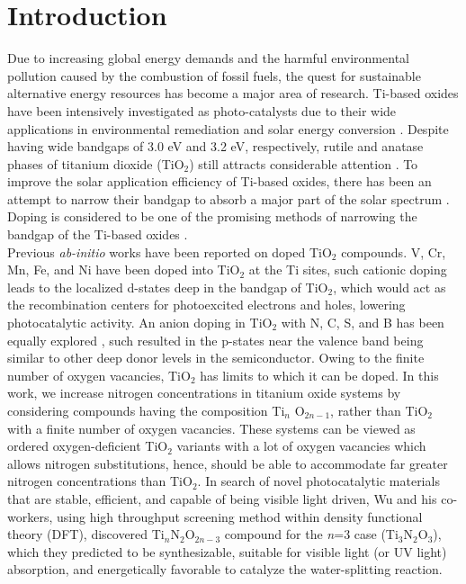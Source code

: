 \documentclass[aps,prb,superscriptaddress,twocolumn,floatfix,showpacs,amsmath]{revtex4-1}
\begin{document}
\section{Introduction}
Due to increasing global energy demands and the harmful environmental pollution caused by the combustion of fossil fuels, the quest for sustainable alternative energy resources has become a major area of research\cite{shaffer2019global}. Ti-based oxides have been intensively investigated as photo-catalysts due to their wide applications in environmental remediation and solar energy conversion \cite{daghrir2013modified,agustina2005review}. Despite having wide bandgaps of 3.0 eV and 3.2 eV, respectively, rutile and anatase phases of titanium dioxide (TiO$_{2}$) still attracts considerable attention \cite{aoki2019insulating,agustina2005review,atambo2019electronic,carloelectronic,fujishima2000titanium,li2016investigation,wu2013first,shirai2018water}. To improve the solar application efficiency of Ti-based oxides, there has been an attempt to narrow their bandgap to absorb a major part of the solar spectrum \cite{khan2012first}. Doping is considered to be one of the promising methods of narrowing the bandgap of the Ti-based oxides \cite{guo2011highly}. 
\\Previous \textit{ab-initio} works have been reported on doped TiO$_{2}$ compounds.  V, Cr, Mn, Fe, and Ni have been doped into TiO$_{2}$ at the Ti sites\cite{inturi2014visible,umebayashi2002analysis}, such cationic doping leads to the localized d-states deep in the bandgap of TiO$_{2}$, which would act as the recombination centers for photoexcited electrons and holes, lowering photocatalytic activity. An anion doping in TiO$_{2}$ with N, C, S, and B has been equally explored \cite{morikawa2001band,fujishima2008tio2,sakthivel2003daylight,schneider2014understanding, morikawa2001band}, such resulted in the p-states near the valence band being similar to other deep donor levels in the semiconductor\cite{schneider2014understanding}. Owing to the  finite number of oxygen vacancies, TiO$_{2}$ has limits to which it can be doped\cite{shevlin2010electronic}.  In this work, we increase nitrogen concentrations in titanium oxide systems by considering  compounds having the composition Ti$_{n}$ O$_{2n-1}$, rather than TiO$_{2}$ with a finite number of oxygen vacancies. These systems can be viewed as ordered oxygen-deficient TiO$_{2}$ variants with a lot of oxygen vacancies which allows nitrogen substitutions, hence, should be able to accommodate far greater nitrogen concentrations than TiO$_{2}$.
 In search of novel photocatalytic materials that are stable, efficient, and capable of being visible light driven, Wu and his co-workers\cite{wu2013first}, using  high throughput screening method within density functional theory (DFT)\cite{Kohn-65}, discovered Ti$_{n}$N$_{2}$O$_{2n-3}$ compound for the \textit{n}=3 case (Ti$_{3}$N$_{2}$O$_{3}$), which they predicted to be synthesizable, suitable for visible light (or UV light) absorption, and energetically favorable to catalyze the water-splitting reaction.
\end{document}
